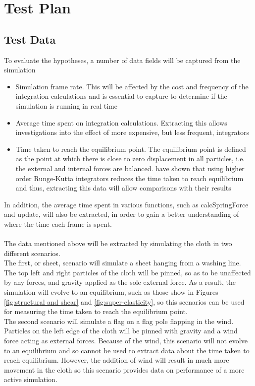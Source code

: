 \chapter{Test Plan}

\section{Test Data}
To evaluate the hypotheses, a number of data fields will be captured from the simulation
\begin{itemize}
\item{Simulation frame rate. This will be affected by the cost and frequency of the integration calculations and is essential to capture to determine if the simulation is running in real time}
\item{Average time spent on integration calculations. Extracting this allows investigations into the effect of more expensive, but less frequent, integrators}
\item{Time taken to reach the equilibrium point. The equilibrium point is defined as the point at which there is close to zero displacement in all particles, i.e. the external and internal forces are balanced. \textcite{Wang2009a} have shown that using higher order Runge-Kutta integrators reduces the time taken to reach equilibrium and thus, extracting this data will allow comparisons with their results}
\end{itemize}
In addition, the average time spent in various functions, such as calcSpringForce and update, will also be extracted, in order to gain a better understanding of where the time each frame is spent.
\\\\The data mentioned above will be extracted by simulating the cloth in two different scenarios.
\\The first, or sheet, scenario will simulate a sheet hanging from a washing line. The top left and right particles of the cloth will be pinned, so as to be unaffected by any forces, and gravity applied as the sole external force. As a result, the simulation will evolve to an equilibrium, such as those show in Figures \ref{fig:structural and shear} and \ref{fig:super-elasticity}, so this scenarios can be used for measuring the time taken to reach the equilibrium point. 
\\The second scenario will simulate a flag on a flag pole flapping in the wind. Particles on the left edge of the cloth will be pinned with gravity and a wind force acting as external forces. Because of the wind, this scenario will not evolve to an equilibrium and so cannot be used to extract data about the time taken to reach equilibrium. However, the addition of wind will result in much more movement in the cloth so this scenario provides data on performance of a more active simulation.

